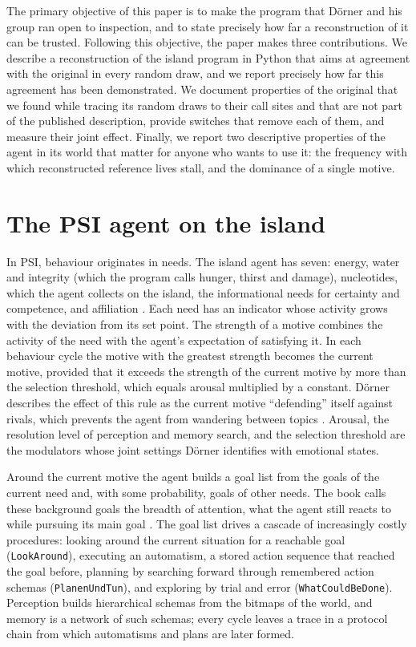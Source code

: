 \documentclass[preprint,12pt,authoryear]{elsarticle}
\newcommand{\code}[1]{\texttt{#1}}
\begin{document}
The primary objective of this paper is to make the program that D\"orner and his group ran open to inspection, and to state precisely how far a reconstruction of it can be trusted. Following this objective, the paper makes three contributions. We describe a reconstruction of the island program in Python that aims at agreement with the original in every random draw, and we report precisely how far this agreement has been demonstrated. We document properties of the original that we found while tracing its random draws to their call sites and that are not part of the published description, provide switches that remove each of them, and measure their joint effect. Finally, we report two descriptive properties of the agent in its world that matter for anyone who wants to use it: the frequency with which reconstructed reference lives stall, and the dominance of a single motive.

\section{The PSI agent on the island}

In PSI, behaviour originates in needs. The island agent has seven: energy, water and integrity (which the program calls hunger, thirst and damage), nucleotides, which the agent collects on the island, the informational needs for certainty and competence, and affiliation \citep{doerner2002mechanik,doerner2013psi}. Each need has an indicator whose activity grows with the deviation from its set point. The strength of a motive combines the activity of the need with the agent's expectation of satisfying it. In each behaviour cycle the motive with the greatest strength becomes the current motive, provided that it exceeds the strength of the current motive by more than the selection threshold, which equals arousal multiplied by a constant. D\"orner describes the effect of this rule as the current motive ``defending'' itself against rivals, which prevents the agent from wandering between topics \citep[pp.~97--98]{doerner2002mechanik}. Arousal, the resolution level of perception and memory search, and the selection threshold are the modulators whose joint settings D\"orner identifies with emotional states.

Around the current motive the agent builds a goal list from the goals of the current need and, with some probability, goals of other needs. The book calls these background goals the breadth of attention, what the agent still reacts to while pursuing its main goal \citep[p.~99]{doerner2002mechanik}. The goal list drives a cascade of increasingly costly procedures: looking around the current situation for a reachable goal (\code{LookAround}), executing an automatism, a stored action sequence that reached the goal before, planning by searching forward through remembered action schemas (\code{PlanenUndTun}), and exploring by trial and error (\code{WhatCouldBeDone}). Perception builds hierarchical schemas from the bitmaps of the world, and memory is a network of such schemas; every cycle leaves a trace in a protocol chain from which automatisms and plans are later formed.
\end{document}

